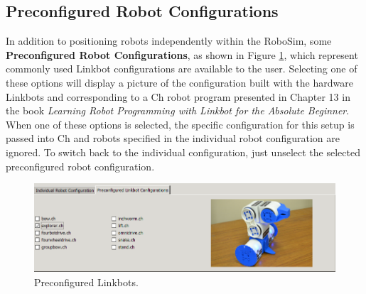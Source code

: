 \documentclass{article}
\begin{document}
\subsection{Preconfigured Robot Configurations}
In addition to positioning robots independently within the RoboSim, some {\bf
Preconfigured Robot Configurations}, as shown in Figure \ref{fig:preconfig},
which represent commonly used Linkbot configurations  are available to the user.
Selecting one of these options will display a picture of the configuration built
with the hardware Linkbots and corresponding to a Ch robot program presented in
Chapter 13 in the book {\em Learning Robot Programming with Linkbot for the
Absolute Beginner}.  When one of these options is selected, the specific
configuration for this setup is passed into Ch and robots specified in the
individual robot configuration are ignored.  To switch back to the individual
configuration, just unselect the selected preconfigured robot configuration.
\begin{figure}[H]
	\begin{center}
		\includegraphics[width=6in]{images/gui_preconfig}
	\end{center}
	\caption{Preconfigured Linkbots.}
	\label{fig:preconfig}
\end{figure}
\end{document}
